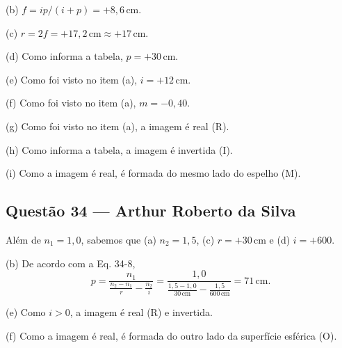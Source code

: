 \documentclass[12pt,a4paper]{article}
\begin{document}
\vspace{0.3cm}

\noindent (b) $f = ip/(i + p) = +8,6 \, \text{cm}$.

\vspace{0.3cm}

\noindent (c) $r = 2f = +17,2 \, \text{cm} \approx +17 \, \text{cm}$.

\vspace{0.3cm}

\noindent (d) Como informa a tabela, $p = +30 \, \text{cm}$.

\vspace{0.3cm}

\noindent (e) Como foi visto no item (a), $i = +12 \, \text{cm}$.

\vspace{0.8cm}

\noindent (f) Como foi visto no item (a), $m = -0,40$.

\vspace{0.15cm}

\noindent (g) Como foi visto no item (a), a imagem é real (R).

\vspace{0.3cm}

\noindent (h) Como informa a tabela, a imagem é invertida (I).

\vspace{0.3cm}

\noindent (i) Como a imagem é real, é formada do mesmo lado do espelho (M).

\subsection{Questão 34 — Arthur Roberto da Silva}
Além de $n_1 = 1,0$, sabemos que (a) $n_2 = 1,5$, (c) $r = +30 \, \text{cm}$ e (d) $i = +600$.

\vspace{0.5cm}

\noindent (b) De acordo com a Eq. 34-8,
\[
p = \frac{n_1}{\frac{n_2 - n_1}{r} - \frac{n_2}{i}} = \frac{1,0}{\frac{1,5 - 1,0}{30 \, \text{cm}} - \frac{1,5}{600 \, \text{cm}}} = 71 \, \text{cm}.
\]

\vspace{0.5cm}

\noindent (e) Como $i > 0$, a imagem é real (R) e invertida.

\vspace{0.5cm}

\noindent (f) Como a imagem é real, é formada do outro lado da superfície esférica (O).
\end{document}
